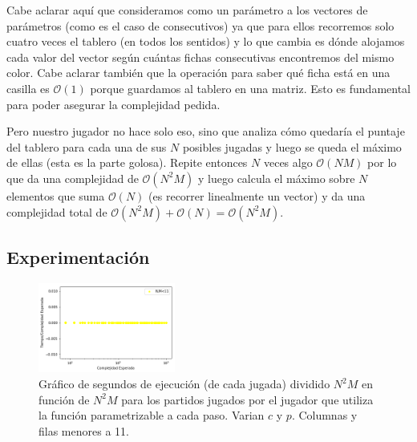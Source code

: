 \documentclass[A4paper,oneside,fleqn,11pt]{article}
\theoremstyle{definition}
\begin{document}
Cabe aclarar aquí que consideramos como un parámetro a los vectores de parámetros (como es el caso de consecutivos) ya que para ellos recorremos solo cuatro veces el tablero (en todos los sentidos) y lo que cambia es dónde alojamos cada valor del vector según cuántas fichas consecutivas encontremos del mismo color. Cabe aclarar también que la operación para saber qué ficha está en una casilla es $\mathcal{O}(1)$ porque guardamos al tablero en una matriz. Esto es fundamental para poder asegurar la complejidad pedida.

 
Pero nuestro jugador no hace solo eso, sino que analiza cómo quedaría el puntaje del tablero para cada una de sus $N$ posibles jugadas y luego se queda el máximo de ellas (esta es la parte golosa). Repite entonces $N$ veces algo  $\mathcal{O}(N M)$ por lo que da una complejidad de $\mathcal{O}(N^2 M)$ y luego calcula el máximo sobre $N$ elementos que suma $\mathcal{O}(N)$ (es recorrer linealmente un vector) y da una complejidad total de $\mathcal{O}(N^2 M) +\mathcal{O}(N) = \mathcal{O}(N^2 M)$.

\subsection{Experimentación}


\begin{figure}
	\includegraphics[width=0.4\textwidth]{complejidad2.png}
	\caption{ Gráfico de segundos de ejecución (de cada jugada) dividido $N^2 M$ en función de $N^2  M$ para los partidos jugados por el jugador que utiliza la función parametrizable a cada paso. Varian $c$ y $p$. Columnas y filas menores a 11.}
\end{figure}
\end{document}
